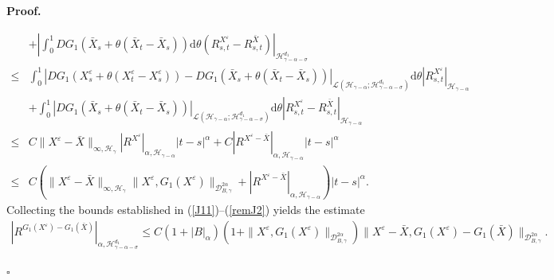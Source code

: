 \documentclass[10pt,a4paper]{article}
\numberwithin{equation}{section}
\newenvironment{proof}[1][\normalfont\bfseries Proof]{%
	\noindent #1.\hspace{0.5em}%
	\ignorespaces%
}{%
	\hfill $\square$%
	\par%
}
\begin{document}
\begin{proof}
\begin{align}
		&+\left|\int_0^1 DG_1(\bar{X}_s+\theta (\bar{X}_t-\bar{X}_s)) \mathrm{d} \theta \left(R_{s,t}^{X^\varepsilon}-R_{s,t}^{\bar{X}} \right) \right|_{\mathcal H_{\gamma-\alpha-\sigma}^{d_1} } \nonumber\\
		\leq & \int_0^1 | DG_1(X_s^\varepsilon+\theta (X_t^\varepsilon-X_s^\varepsilon))-DG_1(\bar{X}_s+\theta (\bar{X}_t-\bar{X}_s)) |_{\mathcal L(\mathcal H_{\gamma-\alpha}; \mathcal H_{\gamma-\alpha-\sigma}^{d_1} )} \mathrm{d} \theta \left|R_{s,t}^{X^\varepsilon} \right|_{\mathcal H_{\gamma-\alpha}}  \nonumber\\
		&+\int_0^1 | DG_1(\bar{X}_s+\theta (\bar{X}_t-\bar{X}_s)) |_{\mathcal L(\mathcal H_{\gamma-\alpha}; \mathcal H_{\gamma-\alpha-\sigma}^{d_1} )}  \mathrm{d} \theta \left|R_{s,t}^{X^\varepsilon}-R_{s,t}^{\bar{X}} \right|_{\mathcal H_{\gamma-\alpha}} \nonumber\\
		\leq & C \|X^\varepsilon-\bar{X}\|_{\infty, \mathcal H_{\gamma}}  |R^{X^\varepsilon}|_{\alpha, \mathcal H_{\gamma-\alpha}} |t-s|^\alpha
		+C |R^{X^\varepsilon-\bar{X}} |_{\alpha, \mathcal H_{\gamma-\alpha}} |t-s|^\alpha \nonumber\\
		\leq & C \left(\|X^\varepsilon-\bar{X}\|_{\infty, \mathcal H_{\gamma}}
		\|X^\varepsilon, G_1(X^\varepsilon)\|_{\mathcal{D}_{ B,\gamma}^{2\alpha}} + |R^{X^\varepsilon-\bar{X}} |_{\alpha, \mathcal H_{\gamma-\alpha}} \right) |t-s|^\alpha .
	\end{align}
	Collecting the bounds established in (\ref{J11})--(\ref{remJ2}) yields the estimate
	\begin{align}\label{G1rem1}
		|R^{G_1(X^\varepsilon)-G_1(\bar{X})} |_{\alpha, \mathcal H_{\gamma-\alpha-\sigma}^{d_1}} \leq C (1+|B|_\alpha) (1+\|X^\varepsilon, G_1(X^\varepsilon)\|_{\mathcal{D}_{ B,\gamma}^{2\alpha}} ) \|X^\varepsilon-\bar{X},G_1(X^\varepsilon)-G_1(\bar{X})\|_{\mathcal{D}_{ B,\gamma}^{2\alpha}}.
	\end{align}
	
	
	

\end{proof}
\end{document}
